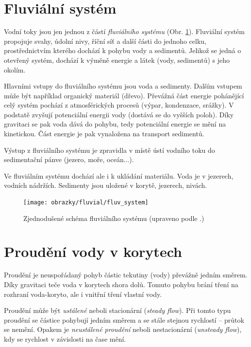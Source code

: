 \section{Fluviální systém}
Vodní toky jsou jen jednou z částí \emph{fluviálního systému} (Obr. \ref{fig:fluvsystem}). Fluviální systém propojuje svahy, údolní nivy, říční síť a další části do jednoho celku, prostřednictvím kterého dochází k pohybu vody a sedimentů. Jelikož se jedná o otevřený systém, dochází k výměně energie a látek (vody, sedimentů) s jeho okolím. 

Hlavními vstupy do fluviálního systému jsou voda a sedimenty. Dalším vstupem může být například organický materiál (dřevo). Převážná část energie pohánějící celý systém pochází z atmosférických procesů (výpar, kondenzace, srážky). V podstatě zvyšují potenciální energii vody (dostává se do vyšších poloh). Díky gravitaci se pak voda dává do pohybu, tedy potenciální energie se mění na kinetickou. Část energie je pak vynaložena na transport sedimentů.

Výstup z fluviálního systému je zpravidla v místě ústí vodního toku do sedimentační pánve (jezero, moře, oceán...). 

Ve fluviálním systému dochází ale i k ukládání materiálu. Voda je v jezerech, vodních nádržích. Sedimenty jsou uložené v korytě, jezerech, nivách.

\begin{figure}
	\centering
	\texttt{[image: obrazky/fluvial/fluv\_system]}
	\caption{Zjednodušené schéma fluviálního systému (upraveno podle \textcite{charltonFundamentalsFluvialGeomorphology2007}.)}
	\label{fig:fluvsystem}
\end{figure}

\section{Proudění vody v korytech}
Proudění je neuspořádaný pohyb částic tekutiny (vody) převážně jedním směrem. Díky gravitaci teče voda v korytech shora dolů. Tomuto pohybu brání tření na rozhraní voda-koryto, ale i vnitřní tření vlastní vody. 

Proudění může být \emph{ustálené} neboli stacionární (\textit{steady flow}). Při tomto typu proudění se částice pohybují jedním směrem a se stále stejnou rychlostí -- průtok se nemění.  Opakem je \emph{neustálené proudění} neboli nestacionární (\textit{unsteady flow}), kdy se rychlost v závislosti na čase mění.

